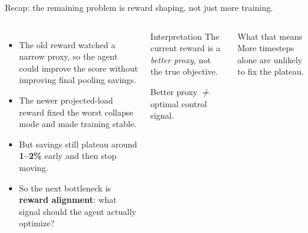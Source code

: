 \documentclass[11pt,aspectratio=43]{beamer}
\begin{document}
\begin{frame}{Recap: the remaining problem is reward shaping, not just more training.}

  \begin{columns}[T,onlytextwidth]
      \begin{itemize}
        \setlength{\itemsep}{0.8em}
        \item The old reward watched a narrow proxy, so the agent could improve the score without improving final pooling savings.
        \item The newer projected-load reward fixed the worst collapse mode and made training stable.
        \item But savings still plateau around \textbf{1--2\%} early and then stop moving.
        \item So the next bottleneck is \textbf{reward alignment}: what signal should the agent actually optimize?
      \end{itemize}

      \begin{block}{Interpretation}
        \small
        The current reward is a \emph{better proxy}, not the true objective.

        \vspace{0.6em}
        Better proxy $\neq$ optimal control signal.
      \end{block}

      \vspace{0.5em}
      \begin{block}{What that means}
        \small
        More timesteps alone are unlikely to fix the plateau.
      \end{block}
  \end{columns}

\end{frame}

\end{document}
